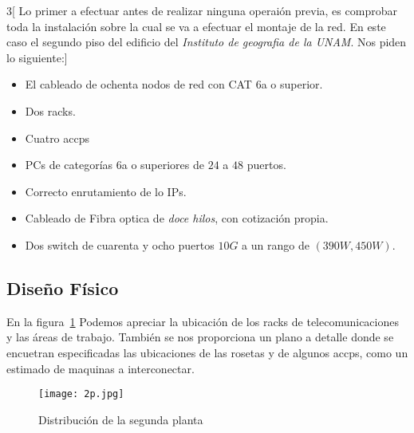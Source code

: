\documentclass[../main.tex]{subfiles}
\begin{document}
\begin{multicols}{3}[
  Lo primer a efectuar antes de realizar ninguna operaión previa, es
  comprobar toda la instalación sobre la cual se va a efectuar el
  montaje de la red. En este caso el segundo piso del edificio del
  \textit{Instituto de geografia de la UNAM}. Nos piden lo siguiente:]

  \begin{itemize}
  \item El cableado de ochenta nodos de red con CAT 6a o superior.
  \item Dos \glspl{rack}.
  \item Cuatro \glspl{accp}
  \item \Glspl{PC} de categorías 6a o superiores de $24$ a $48$
    puertos.
  \item Correcto enrutamiento de lo IPs.
  \item Cableado de Fibra optica de \textit{doce hilos}, con cotización
    propia.
  \item Dos switch de cuarenta y ocho puertos $10G$ a un rango de
    $(390W, 450W)$.
    
  \end{itemize}
\end{multicols}

\subsection{Diseño Físico}\label{sec:disfis}

En la figura\ \ref{fig:dsp} Podemos apreciar
la ubicación de los racks de
telecomunicaciones y las áreas de trabajo.
También se nos proporciona un plano a detalle
donde se encuetran especificadas las
ubicaciones de las \glspl{roseta} y de
algunos \glspl{accp}, como un estimado de maquinas
a interconectar.

\begin{figure}[H]
  \centering
  \texttt{[image: 2p.jpg]}
  \caption{Distribución de la segunda planta}
  \label{fig:dsp}
\end{figure}
\end{document}

